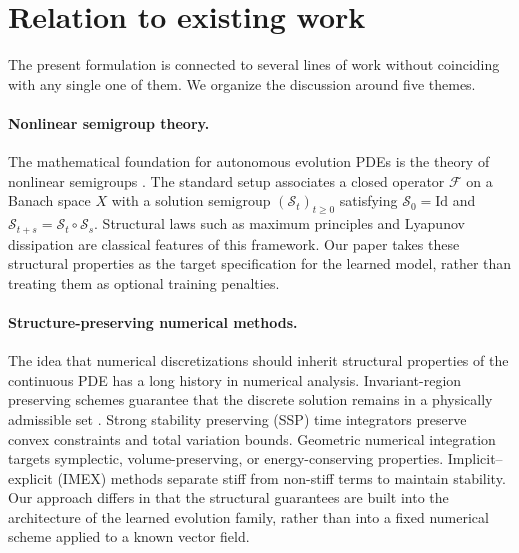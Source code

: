 \documentclass[hidelinks,review,nohypdvips,onefignum,onetabnum]{siamart220329}
\newcommand{\cS}{\mathcal{S}}
\newcommand{\cF}{\mathcal{F}}
\begin{document}
\section{Relation to existing work}\label{sec:related-work}

The present formulation is connected to several lines of work without coinciding with any single one of them. We organize the discussion around five themes.

\paragraph{Nonlinear semigroup theory.}
The mathematical foundation for autonomous evolution PDEs is the theory of nonlinear semigroups \cite{Pazy1983Semigroups,CazenaveHaraux1998Semilinear,Barbu2010NonlinearDE}. The standard setup associates a closed operator $\cF$ on a Banach space $X$ with a solution semigroup $(\cS_t)_{t\ge 0}$ satisfying $\cS_0=\mathrm{Id}$ and $\cS_{t+s}=\cS_t\circ \cS_s$. Structural laws such as maximum principles and Lyapunov dissipation are classical features of this framework. Our paper takes these structural properties as the target specification for the learned model, rather than treating them as optional training penalties.

\paragraph{Structure-preserving numerical methods.}
The idea that numerical discretizations should inherit structural properties of the continuous PDE has a long history in numerical analysis. Invariant-region preserving schemes guarantee that the discrete solution remains in a physically admissible set \cite{KarlsenRisebro2003Invariant,HundsdorferVerwer2003Numerical,ChernogorovaTemov2022InvariantRegion}. Strong stability preserving (SSP) time integrators \cite{GottliebShuTadmor2001StrongStability} preserve convex constraints and total variation bounds. Geometric numerical integration \cite{HairerLubichWanner2006Geometric,SanzSerna2016Geometric} targets symplectic, volume-preserving, or energy-conserving properties. Implicit--explicit (IMEX) methods \cite{PareschiRusso2005IMEX} separate stiff from non-stiff terms to maintain stability. Our approach differs in that the structural guarantees are built into the architecture of the learned evolution family, rather than into a fixed numerical scheme applied to a known vector field.
\end{document}
